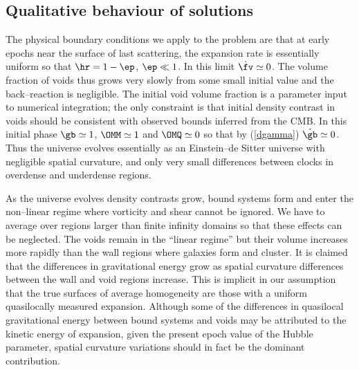 \documentclass[12pt]{iopart}
\begin{document}
\subsection{Qualitative behaviour of solutions\label{qual}}

The physical boundary conditions we apply to the problem are that at
early epochs near the surface of last scattering, the expansion rate is
essentially uniform so that $\hr=1-\ep$, $\ep\ll1$. In this limit $\dot\fv
\simeq0$. The volume fraction of voids thus grows very slowly
from some small initial value and the back--reaction is negligible.
The initial void volume fraction is a parameter input to numerical
integration; the only constraint is that initial density contrast in voids
should be consistent with observed bounds inferred from the CMB. In this
initial phase $\gb\simeq1$, $\OMM\simeq1$ and $\OMQ\simeq0$ so that by
(\ref{dgamma}) $\dot\gb\simeq0$. Thus the universe evolves essentially as
an Einstein--de Sitter universe with negligible spatial curvature, and
only very small differences between clocks in overdense and underdense
regions.

As the universe evolves density contrasts grow, bound systems form and
enter the non--linear regime where vorticity and shear cannot be
ignored. We have to average over regions larger than finite infinity
domains so that these effects can be neglected.
The voids remain in the ``linear regime'' but their volume increases
more rapidly than the wall regions where galaxies form and cluster. It is
claimed that the differences in gravitational energy grow as spatial
curvature differences between the wall and void regions increase.
This is implicit in our assumption that the true surfaces of average
homogeneity are those with a uniform quasilocally measured expansion.
Although some of the differences in quasilocal gravitational energy
between bound systems and voids may be attributed to the kinetic
energy of expansion, given the present epoch value of the Hubble
parameter, spatial curvature variations should in fact be the dominant
contribution.
\end{document}
